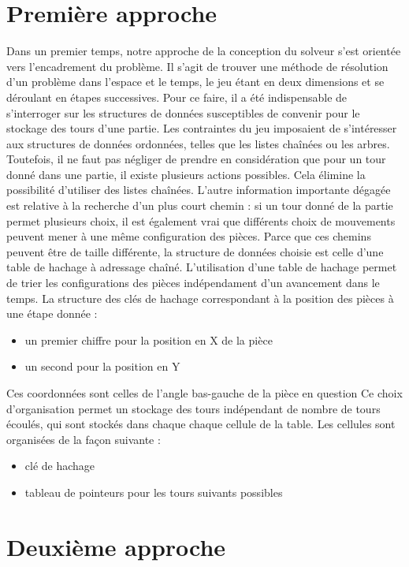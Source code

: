 \documentclass{report}
\begin{document}
\section{Première approche}
Dans un premier temps, notre approche de la conception du solveur s'est orientée vers l'encadrement du problème.
Il s'agit de trouver une méthode de résolution d'un problème dans l'espace et le temps, le jeu étant en deux dimensions et se déroulant en étapes successives.
Pour ce faire, il a été indispensable de s'interroger sur les structures de données susceptibles de convenir pour le stockage des tours d'une partie.
Les contraintes du jeu imposaient de s'intéresser aux structures de données ordonnées, telles que les listes chaînées ou les arbres.
Toutefois, il ne faut pas négliger de prendre en considération que pour un tour donné dans une partie, il existe plusieurs actions possibles.
Cela élimine la possibilité d'utiliser des listes chaînées.
L'autre information importante dégagée est relative à la recherche d'un plus court chemin : si un tour donné de la partie permet plusieurs choix, il est également vrai que différents choix de mouvements peuvent mener à une même configuration des pièces.
Parce que ces chemins peuvent être de taille différente, la structure de données choisie est celle d'une table de hachage à adressage chaîné.
L'utilisation d'une table de hachage permet de trier les configurations des pièces indépendament d'un avancement dans le temps.
La structure des clés de hachage correspondant à la position des pièces à une étape donnée :
\begin{itemize}
\item un premier chiffre pour la position en X de la pièce 
\item un second pour la position en Y 
\end{itemize}
Ces coordonnées sont celles de l'angle bas-gauche de la pièce en question
Ce choix d'organisation permet un stockage des tours indépendant de nombre de tours écoulés, qui sont stockés dans chaque chaque cellule de la table.
Les cellules sont organisées de la façon suivante :
\begin{itemize}
\item clé de hachage
\item tableau de pointeurs pour les tours suivants possibles
\end{itemize}

\section{Deuxième approche}
\end{document}
